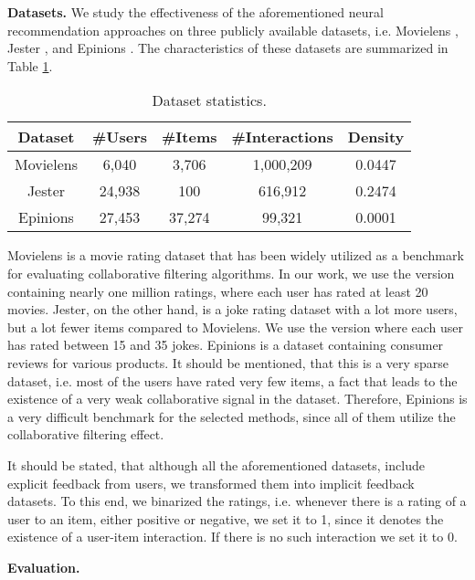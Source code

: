 
\textbf{Datasets.}
We study the effectiveness of the aforementioned neural recommendation approaches on three publicly available datasets, i.e. Movielens \cite{harper2016movielens}, Jester \cite{jester}, and Epinions \cite{epinions}. 
The characteristics of these datasets are summarized in Table \ref{tab:datasets}.

\begin{table}[h]
    \centering
    \begin{tabular}{c|c|c|c|c}
        \hline
        Dataset & \#Users & \#Items & \#Interactions & Density \\
        \hline
        Movielens &  6,040 &  3,706 & 1,000,209 & 0.0447 \\
        Jester    & 24,938 &    100 &   616,912 & 0.2474 \\
        Epinions  & 27,453 & 37,274 &    99,321 & 0.0001
    \end{tabular}
    \caption{Dataset statistics.}
    \label{tab:datasets}
\end{table}

Movielens is a movie rating dataset that has been widely utilized as a benchmark for evaluating collaborative filtering algorithms.
In our work, we use the version containing nearly one million ratings, where each user has rated at least 20 movies.
Jester, on the other hand, is a joke rating dataset with a lot more users, but a lot fewer items compared to Movielens.
We use the version where each user has rated between 15 and 35 jokes.
Epinions is a dataset containing consumer reviews for various products. 
It should be mentioned, that this is a very sparse dataset, i.e. most of the users have rated very few items, a fact that leads to the existence of a very weak collaborative signal in the dataset. 
Therefore, Epinions is a very difficult benchmark for the selected methods, since all of them utilize the collaborative filtering effect.

It should be stated, that although all the aforementioned datasets, include explicit feedback from users, we transformed them into implicit feedback datasets.
To this end, we binarized the ratings, i.e. whenever there is a rating of a user to an item, either positive or negative, we set it to 1, since it denotes the existence of a user-item interaction. 
If there is no such interaction we set it to 0.

\textbf{Evaluation.}
